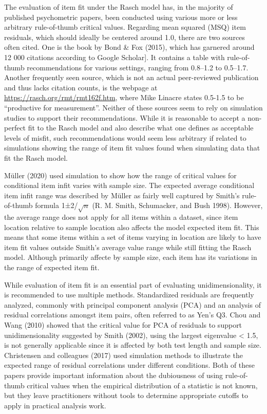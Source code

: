 \documentclass[
  letterpaper,
  DIV=11,
  numbers=noendperiod]{scrartcl}
\begin{document}
The evaluation of item fit under the Rasch model has, in the majority of
published psychometric papers, been conducted using various more or less
arbitrary rule-of-thumb critical values. Regarding mean squared (MSQ)
item residuals, which should ideally be centered around 1.0, there are
two sources often cited. One is the book by Bond \& Fox (2015), which
has garnered around 12 000 citations according to Google Scholar{]}. It
contains a table with rule-of-thumb recommendations for various
settings, ranging from 0.8--1.2 to 0.5--1.7. Another frequently seen
source, which is not an actual peer-reviewed publication and thus lacks
citation counts, is the webpage at
\url{https://rasch.org/rmt/rmt162f.htm}, where Mike Linacre states
0.5-1.5 to be ``productive for measurement''. Neither of these sources
seem to rely on simulation studies to support their recommendations.
While it is reasonable to accept a non-perfect fit to the Rasch model
and also describe what one defines as acceptable levels of misfit, such
recommendations would seem less arbitrary if related to simulations
showing the range of item fit values found when simulating data that fit
the Rasch model.

Müller (2020) used simulation to show how the range of critical values
for conditional item infit varies with sample size. The expected average
conditional item infit range was described by Müller as fairly well
captured by Smith's rule-of-thumb formula 1±2/\(\sqrt{n}\) (R. M. Smith,
Schumacker, and Bush 1998). However, the average range does not apply
for all items within a dataset, since item location relative to sample
location also affects the model expected item fit. This means that some
items within a set of items varying in location are likely to have item
fit values outside Smith's average value range while still fitting the
Rasch model. Although primarily affecte by sample size, each item has
its variations in the range of expected item fit.

While evaluation of item fit is an essential part of evaluating
unidimensionality, it is recommended to use multiple methods.
Standardized residuals are frequently analyzed, commonly with principal
component analysis (PCA) and an analysis of residual correlations
amongst item pairs, often referred to as Yen's Q3. Chou and Wang (2010)
showed that the critical value for PCA of residuals to support
unidimensionality suggested by Smith (2002), using the largest
eigenvalue \textless{} 1.5, is not generally applicable since it is
affected by both test length and sample size. Christensen and colleagues
(2017) used simulation methods to illustrate the expected range of
residual correlations under different conditions. Both of these papers
provide important information about the dubiousness of using
rule-of-thumb critical values when the empirical distribution of a
statistic is not known, but they leave practitioners without tools to
determine appropriate cutoffs to apply in practical analysis work.
\end{document}
